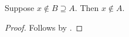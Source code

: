 

\begin{composition}\label{independent_negative_left}
    Suppose $x\notin B\supseteq A$.
    Then $x\notin A$.
\end{composition}
\begin{proof}
    Follows by .
\end{proof}
